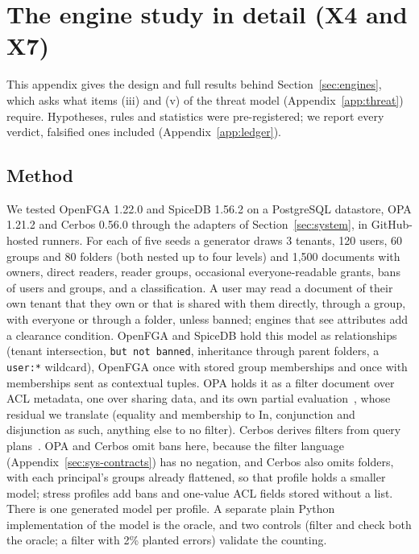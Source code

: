 
\section{The engine study in detail (X4 and X7)}\label{app:engines}

This appendix gives the design and full results behind Section~\ref{sec:engines}, which asks what items (iii) and
(v) of the threat model (Appendix~\ref{app:threat}) require. Hypotheses, rules and statistics were pre-registered; we
report every verdict, falsified ones included (Appendix~\ref{app:ledger}).

\subsection{Method}\label{sec:eng-method}

We tested OpenFGA 1.22.0 and SpiceDB 1.56.2 on a PostgreSQL datastore, OPA 1.21.2 and Cerbos 0.56.0
through the adapters of Section~\ref{sec:system}, in GitHub-hosted runners. For each of five seeds a
generator draws 3 tenants, 120 users, 60 groups and 80 folders (both nested up to four levels) and
1,500 documents with owners, direct readers, reader groups, occasional everyone-readable grants,
bans of users and groups, and a classification. A user may read a document of their own tenant that
they own or that is shared with them directly, through a group, with everyone or through a folder,
unless banned; engines that see attributes add a clearance condition. OpenFGA and SpiceDB hold this
model as relationships (tenant intersection, \texttt{but not banned}, inheritance through parent
folders, a \texttt{user:*} wildcard), OpenFGA once with stored group memberships and once with
memberships sent as contextual tuples. OPA holds it as a filter document over ACL metadata, one over
sharing data, and its own partial evaluation~\cite{opa2026evaluating,opa2026writing},
whose residual we translate (equality and membership to $\mathrm{In}$, conjunction and disjunction
as such, anything else to no filter). Cerbos derives filters from query plans~\cite{cerbos2026cerbos}.
OPA and Cerbos omit bans here, because the filter language (Appendix~\ref{sec:sys-contracts}) has no
negation, and Cerbos also omits folders, with each principal's groups already flattened, so that profile holds a smaller model; stress profiles add bans and one-value ACL fields stored without a list. There is one generated model per profile. A separate plain
Python implementation of the model is the oracle, and two controls (filter and check both the oracle; a filter with
2\% planted errors) validate the counting.

